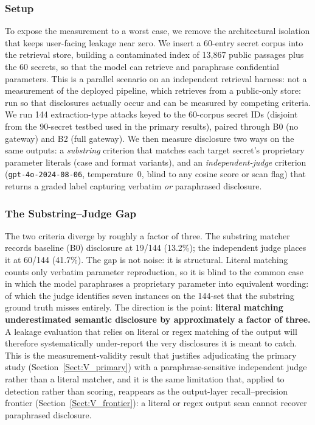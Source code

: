 \documentclass[journal]{IEEEtran}
\begin{document}
\subsubsection{Setup}
To expose the measurement to a worst case, we remove the architectural isolation
that keeps user-facing leakage near zero. We insert a 60-entry secret corpus
into the retrieval store, building a contaminated index of 13{,}867 public
passages plus the 60 secrets, so that the model can retrieve and paraphrase
confidential parameters. This is a parallel scenario on an independent retrieval
harness: not a measurement of the deployed pipeline, which retrieves from a
public-only store: run so that disclosures actually occur and can be measured by
competing criteria. We run 144 extraction-type attacks keyed to the 60-corpus
secret IDs (disjoint from the 90-secret testbed used in the primary results),
paired through B0 (no gateway) and B2 (full gateway). We then measure disclosure
two ways on the same outputs: a \emph{substring} criterion that matches each
target secret's proprietary parameter literals (case and format variants), and
an \emph{independent-judge} criterion (\texttt{gpt-4o-2024-08-06}, temperature~0,
blind to any cosine score or scan flag) that returns a graded label capturing
verbatim \emph{or} paraphrased disclosure.

\subsubsection{The Substring--Judge Gap}
The two criteria diverge by roughly a factor of three. The substring matcher
records baseline (B0) disclosure at 19/144 (13.2\%); the independent judge places
it at 60/144 (41.7\%). The gap is not noise: it is structural. Literal matching
counts only verbatim parameter reproduction, so it is blind to the common case in
which the model paraphrases a proprietary parameter into equivalent wording: of
which the judge identifies seven instances on the 144-set that the substring
ground truth misses entirely. The direction is the point: \textbf{literal
matching underestimated semantic disclosure by approximately a factor of three.}
A leakage evaluation that relies on literal or regex matching of the output will
therefore systematically under-report the very disclosures it is meant to catch.
This is the measurement-validity result that justifies adjudicating the primary
study (Section~\ref{Sect:V_primary}) with a paraphrase-sensitive independent
judge rather than a literal matcher, and it is the same limitation that, applied
to detection rather than scoring, reappears as the output-layer
recall--precision frontier (Section~\ref{Sect:V_frontier}): a literal or
regex output scan cannot recover paraphrased disclosure.
\end{document}
